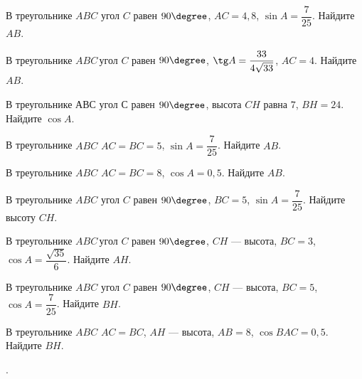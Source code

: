 \begin{class}[number=3]
\begin{listofex}
		\item В треугольнике \( ABC \) угол \( C \) равен \( 90\degree \), \( AC = 4,8 \),  \( \sin A = \dfrac{7}{25} \).  Найдите \( AB \).
		\item В треугольнике \( ABC \) угол \( C \) равен \( 90\degree \),  \( \tg A = \dfrac{33}{4\sqrt{33}} \),  \( AC =  4 \). Найдите \( AB \).
		\item В треугольнике \( АВС \) угол \( С \) равен \( 90\degree \), высота \( CH \) равна \( 7 \), \( BH = 24 \). Найдите  \( \cos A \).
		\item В треугольнике \( ABC \) \( AC=BC=5\),  \( \sin A = \dfrac{7}{25} \).  Найдите \(AB\).
		\item В треугольнике \( ABC \) \( AC = BC = 8 \),  \( \cos A = 0,5 \). Найдите \(AB\).
		\item В треугольнике \( ABC \) угол \( C \) равен \( 90\degree \), \( BC=5 \), \( \sin A=\dfrac{7}{25} \).  Найдите высоту \( CH \).
		\item В треугольнике \( ABC \) угол \( C \) равен \( 90\degree \), \( CH \) --- высота, \( BC=3 \), \( \cos A=\dfrac{\sqrt{35}}{6} \).  Найдите \( AH \).
		\item В треугольнике \( ABC \) угол \( C \) равен \( 90\degree \), \( CH \) --- высота, \( BC=5 \),  \( \cos A=\dfrac{7}{25} \).  Найдите \( BH \).
		\item В треугольнике \( ABC \) \( AC = BC \), \( AH \) --- высота, \( AB = 8 \),  \( \cos BAC = 0,5 \). Найдите \( BH \).
	\end{listofex}
\end{class}

\begin{class}[number=4]
	\begin{listofex}
		\item .
	\end{listofex}
\end{class}

